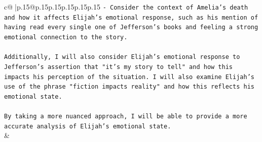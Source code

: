 \documentclass{article}
\begin{document}
{\begin{supertabular}{c@{$\;$}|p{.15\linewidth}@{}p{.15\linewidth}p{.15\linewidth}p{.15\linewidth}p{.15\linewidth}p{.15\linewidth}}
{{{\texttt{{-} Consider the context of Amelia's death and how it affects Elijah's emotional response, such as his mention of having read every single one of Jefferson's books and feeling a strong emotional connection to the story.} \\
\\ 
\texttt{Additionally, I will also consider Elijah's emotional response to Jefferson's assertion that "it's my story to tell" and how this impacts his perception of the situation. I will also examine Elijah's use of the phrase "fiction impacts reality" and how this reflects his emotional state.} \\
\\ 
\texttt{By taking a more nuanced approach, I will be able to provide a more accurate analysis of Elijah's emotional state.} \\
            }
        }
    }
    & \\ \\

\end{supertabular}
}
\end{document}
